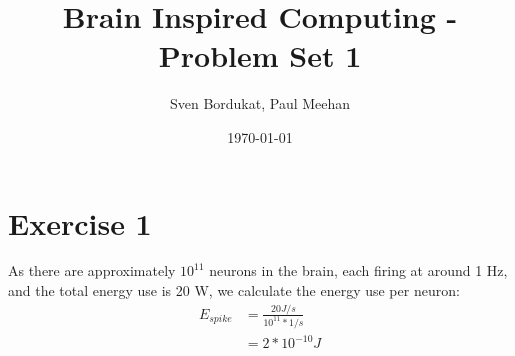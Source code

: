 \documentclass[a4paper]{article}
\begin{document}

\title{Brain Inspired Computing - Problem Set 1}

\author{Sven Bordukat, Paul Meehan}

\date{\today}

\maketitle

\section*{Exercise 1}
As there are approximately $10^{11}$ neurons in the brain, each firing at around
1 Hz, and the total energy use is 20 W, we calculate the energy use per neuron:
\begin{align}
    E_{spike} &= \frac{20 J/s}{10^{11}*1/s}\\
    &= 2 * 10^{-10} J
\end{align}
\end{document}
